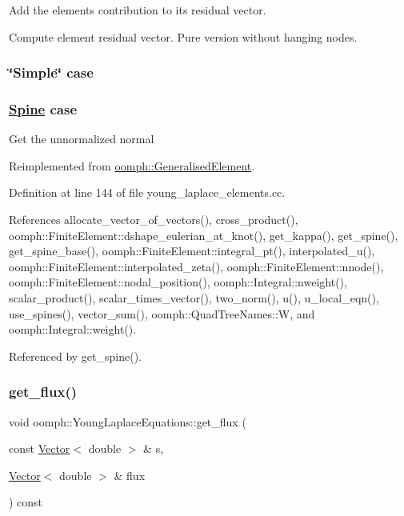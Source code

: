 Add the element\textquotesingle{}s contribution to its residual vector. 

Compute element residual vector. Pure version without hanging nodes. \subsubsection*{\char`\"{}\+Simple\char`\"{} case }

\subsubsection*{\hyperlink{classoomph_1_1Spine}{Spine} case }

Get the unnormalized normal 

Reimplemented from \hyperlink{classoomph_1_1GeneralisedElement_a310c97f515e8504a48179c0e72c550d7}{oomph\+::\+Generalised\+Element}.



Definition at line 144 of file young\+\_\+laplace\+\_\+elements.\+cc.



References allocate\+\_\+vector\+\_\+of\+\_\+vectors(), cross\+\_\+product(), oomph\+::\+Finite\+Element\+::dshape\+\_\+eulerian\+\_\+at\+\_\+knot(), get\+\_\+kappa(), get\+\_\+spine(), get\+\_\+spine\+\_\+base(), oomph\+::\+Finite\+Element\+::integral\+\_\+pt(), interpolated\+\_\+u(), oomph\+::\+Finite\+Element\+::interpolated\+\_\+zeta(), oomph\+::\+Finite\+Element\+::nnode(), oomph\+::\+Finite\+Element\+::nodal\+\_\+position(), oomph\+::\+Integral\+::nweight(), scalar\+\_\+product(), scalar\+\_\+times\+\_\+vector(), two\+\_\+norm(), u(), u\+\_\+local\+\_\+eqn(), use\+\_\+spines(), vector\+\_\+sum(), oomph\+::\+Quad\+Tree\+Names\+::W, and oomph\+::\+Integral\+::weight().



Referenced by get\+\_\+spine().

\mbox{\label{classoomph_1_1YoungLaplaceEquations_ae0cc35d476be29d1c6395f227bb323e4}} 
\subsubsection{\texorpdfstring{get\+\_\+flux()}{get\_flux()}}
{\footnotesize\ttfamily void oomph\+::\+Young\+Laplace\+Equations\+::get\+\_\+flux (\begin{DoxyParamCaption}\item[{const \hyperlink{classoomph_1_1Vector}{Vector}$<$ double $>$ \&}]{s,  }\item[{\hyperlink{classoomph_1_1Vector}{Vector}$<$ double $>$ \&}]{flux }\end{DoxyParamCaption}) const\hspace{0.3cm}{\ttfamily [inline]}}




